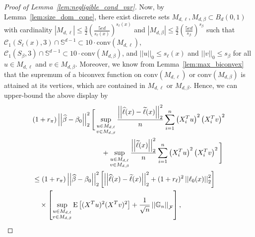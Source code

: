 \documentclass[ejsv2,noshowframe]{imsart}
\theoremstyle{plain}
\theoremstyle{definition}
\theoremstyle{remark}
\newcommand{\norm}[1]{\left|\left| #1 \right|\right|}
\renewcommand{\hat}{\widehat}
\renewcommand{\tilde}{\widetilde}
\begin{document}
\begin{proof}[Proof of Lemma~\ref{lem:negligible_cond_var}]
	
	Now, by Lemma~\ref{lem:size_dom_cone}, there exist discrete sets $M_{d,\ell}, M_{d,\beta} \subset B_d(0,1)$ with cardinality $|M_{d,\ell}| \leq \frac{3}{2} \left(\frac{5ed}{s_{\ell}(x)} \right)^{s_{\ell}(x)}$ and $|M_{d,\beta}| \leq \frac{3}{2} \left(\frac{5ed}{s_{\beta}} \right)^{s_{\beta}}$ such that $\mathcal{C}_1(S_{\ell}(x),3) \cap \mathbb{S}^{d-1} \subset 10 \cdot \mathrm{conv}(M_{d,\ell})$, $\mathcal{C}_1(S_{\beta},3) \cap \mathbb{S}^{d-1} \subset 10 \cdot \mathrm{conv}(M_{d,\beta})$, and $\norm{u}_0 \leq s_{\ell}(x)$ and $\norm{v}_0 \leq s_{\beta}$ for all $u\in M_{d,\ell}$ and $v\in M_{d,\beta}$. Moreover, we know from Lemma~\ref{lem:max_biconvex} that the supremum of a biconvex function on $\mathrm{conv}(M_{d,\ell})$ or $\mathrm{conv}(M_{d,\beta})$ is attained at its vertices, which are contained in $M_{d,\ell}$ or $M_{d,\beta}$. Hence, we can upper-bound the above display by
	\begin{align*}
		&(1+r_{\pi}) \norm{\hat{\beta}-\beta_0}_2^2 \Bigg[\sup_{\substack{u\in M_{d,\ell} \\v\in M_{d,\beta}}} \frac{\norm{\hat{\ell}(x) -\tilde{\ell}(x)}_2^2}{n}\sum_{i=1}^n \left(X_i^Tu\right)^2 \left(X_i^T v\right)^2  \\
		&\hspace{35mm} + \sup_{\substack{u\in M_{d,\ell}\\v\in M_{d,\beta}}} \frac{\norm{\tilde{\ell}(x)}_2^2}{n}\sum_{i=1}^n \left(X_i^Tu\right)^2 \left(X_i^T v\right)^2\Bigg]\\
		&\leq (1+r_{\pi}) \norm{\hat{\beta}-\beta_0}_2^2 \left[\norm{\hat{\ell}(x) -\tilde{\ell}(x)}_2^2 + (1+r_{\ell})^2 \norm{\ell_0(x)}_2^2\right] \\
		&\quad \times \left[\sup_{\substack{u\in M_{d,\ell}\\v\in M_{d,\beta}}}\mathrm{E}\left[(X^Tu)^2 (X^Tv)^2\right] + \frac{1}{\sqrt{n}}\norm{\mathbb{G}_n}_{\mathcal{F}} \right],

\end{align*}
\end{proof}
\end{document}
